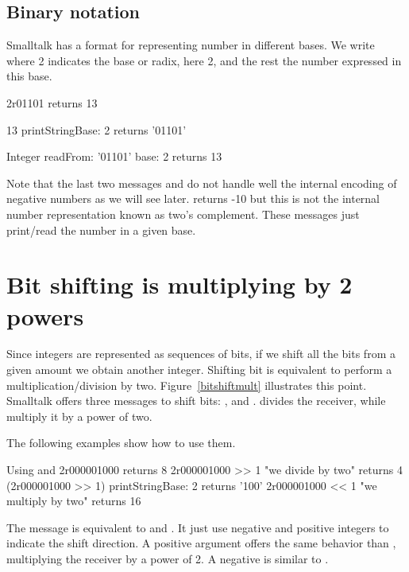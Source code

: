 \documentclass[a4paper,10pt,twoside]{book}
\begin{document}
\subsection*{Binary notation}
Smalltalk has a format for representing number in different bases. We write  where 2 indicates the base or radix, here 2, and the rest the number expressed in this base.

\begin{code}{}
2r01101
	returns 13

13 printStringBase: 2
	returns '01101'
	
Integer readFrom: '01101' base: 2 	
	returns 13
\end{code}

Note that the last two messages  and  do not handle well the internal encoding of negative numbers as we will see later.  returns -10 but this is not the internal number representation known as two's complement. These messages just print/read the number in a given base. 



\section{Bit shifting is multiplying by 2 powers}

Since integers are represented as sequences of bits, if we shift all the bits from a given amount we obtain another integer. Shifting bit is equivalent to perform a multiplication/division by two. Figure~\ref{bitshiftmult} illustrates this point. Smalltalk offers three messages to shift bits: ,  and . \ct{>>} divides the receiver, while \ct{<<} multiply it by a power of two.

The following examples show how to use them.


\begin{code}{Using \ct{>>} and \ct{<<}}
2r000001000 
	returns 8
2r000001000 >> 1					"we divide by two"
	returns 4
(2r000001000 >> 1) printStringBase: 2 	
	returns '100'
2r000001000 << 1					"we multiply by two"
	returns 16
\end{code}

The message  is equivalent to \ct{>>} and \ct{<<}. It just use negative and positive integers to indicate the shift direction. A positive argument offers the same behavior than \ct{<<}, multiplying the receiver by a power of 2. A negative is similar to \ct{>>}. 
\end{document}
